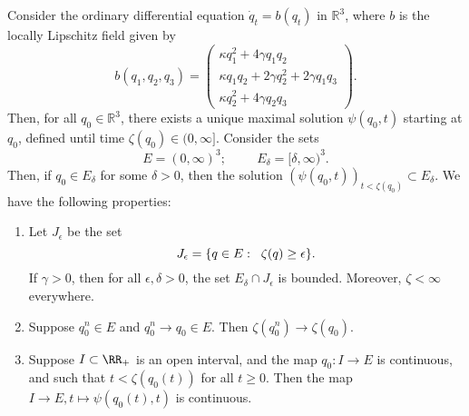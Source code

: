 \begin{lemma}\label{lemma: ODE considerations} Consider the ordinary differential equation $\dot{q}_t=b(q_t)$ in $\mathbb{R}^3$, where $b$ is the locally Lipschitz field given by \begin{equation} \label{eq: system of ODEs} b(q_1,q_2,q_3)=\begin{pmatrix}\kappa q_1^2+4\gamma q_1q_2 \\ \kappa q_1q_2+2\gamma q_2^2+2\gamma q_1q_3 \\ \kappa q_2^2 + 4\gamma q_2q_3 \end{pmatrix}. \end{equation} Then, for all $q_0\in \mathbb{R}^3$, there exists a unique maximal solution $\psi(q_0, t)$ starting at $q_0$, defined until time $\zeta(q_0)\in (0, \infty]$. Consider the sets \begin{equation} E=(0, \infty)^3; \hspace{1cm} E_\delta=[\delta,\infty)^3.\end{equation} Then, if $q_0 \in E_\delta$ for some $\delta>0$, then the solution $(\psi(q_0,t))_{t<\zeta(q_0)} \subset E_\delta$. We have the following properties: \begin{enumerate}[label=\roman{*}).] \item Let $J_\epsilon$ be the set \begin{equation} J_\epsilon  =\{q \in E: \hspace{0.2cm} \zeta(q)\ge\epsilon\}.\end{equation} If $\gamma>0$, then for all $\epsilon, \delta>0$, the set $E_\delta \cap J_\epsilon $ is bounded. Moreover, $\zeta<\infty$ everywhere. \item Suppose $q^n_0 \in E$ and $q^n_0 \rightarrow q_0 \in E$. Then $\zeta(q^n_0)\rightarrow \zeta(q_0).$ \item Suppose $I\subset \RR_+$ is an open interval, and the map $q_0: I\rightarrow E$ is continuous, and such that $t<\zeta(q_0(t))$ for all $t\ge 0.$ Then the map $I\rightarrow E, t\mapsto \psi(q_0(t), t)$ is continuous. 
 \end{enumerate} \end{lemma} 

